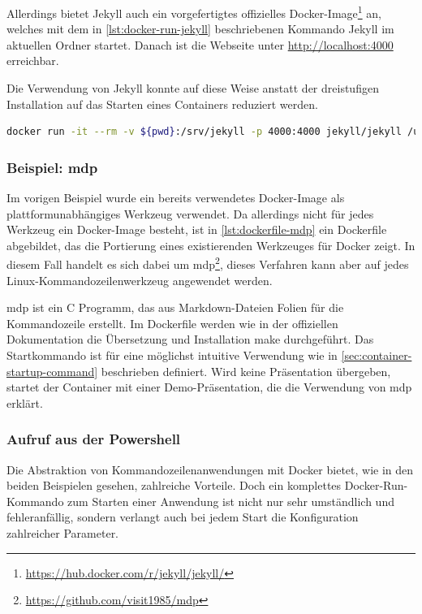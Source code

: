 Allerdings bietet Jekyll auch ein vorgefertigtes offizielles Docker-Image\footnote{\url{https://hub.docker.com/r/jekyll/jekyll/}} an, welches mit dem in \cref{lst:docker-run-jekyll} beschriebenen Kommando Jekyll im aktuellen Ordner startet.
Danach ist die Webseite unter \url{http://localhost:4000} erreichbar.

Die Verwendung von Jekyll konnte auf diese Weise anstatt der dreistufigen Installation auf das Starten eines Containers reduziert werden.

\begin{lstlisting}[caption=Docker-Kommando zum Starten von Jekyll, language=bash, label=lst:docker-run-jekyll]
docker run -it --rm -v ${pwd}:/srv/jekyll -p 4000:4000 jekyll/jekyll /usr/local/bin/jekyll serve
\end{lstlisting}

\subsubsection{Beispiel: mdp}
Im vorigen Beispiel wurde ein bereits verwendetes Docker-Image als plattformunabhängiges Werkzeug verwendet.
Da allerdings nicht für jedes Werkzeug ein Docker-Image besteht, ist in \cref{lst:dockerfile-mdp} ein Dockerfile abgebildet, das die Portierung eines existierenden Werkzeuges für Docker zeigt.
In diesem Fall handelt es sich dabei um mdp\footnote{\url{https://github.com/visit1985/mdp}}, dieses Verfahren kann aber auf jedes Linux-Kommandozeilenwerkzeug angewendet werden.

mdp ist ein C Programm, das aus Markdown-Dateien Folien für die Kommandozeile erstellt.
Im Dockerfile werden wie in der offiziellen Dokumentation die Übersetzung und Installation make durchgeführt.
Das Startkommando ist für eine möglichst intuitive Verwendung wie in \cref{sec:container-startup-command} beschrieben definiert.
Wird keine Präsentation übergeben, startet der Container mit einer Demo-Präsentation, die die Verwendung von mdp erklärt.



\subsubsection{Aufruf aus der Powershell}
Die Abstraktion von Kommandozeilenanwendungen mit Docker bietet, wie in den beiden Beispielen gesehen, zahlreiche Vorteile.
Doch ein komplettes Docker-Run-Kommando zum Starten einer Anwendung ist nicht nur sehr umständlich und fehleranfällig, sondern verlangt auch bei jedem Start die Konfiguration zahlreicher Parameter.

